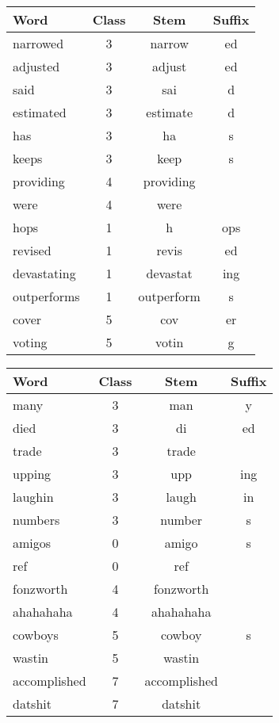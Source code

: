 \documentclass{article}
\begin{document}
\begin{table*}[ht]
\begin{minipage}[b]{0.5\linewidth}\centering
\begin{tabular}{lccc}
\hline
Word & Class & Stem & Suffix \\
\hline
narrowed&3&narrow&ed \\
adjusted&3&adjust&ed \\
said&3&sai&d \\
estimated&3&estimate&d \\
has&3&ha&s \\
keeps&3&keep&s \\
providing & 4 & providing & \\
were&4&were& \\
hops&1&h&ops \\ 
revised&1&revis&ed \\
devastating&1&devastat&ing\\
outperforms&1&outperform&s\\
cover&5&cov&er \\
voting&5&votin&g \\
\hline
 \end{tabular}
\caption{\label{outputWSJ} Sample output from WSJ}
\end{minipage}
\begin{minipage}[b]{0.5\linewidth}\centering
\begin{tabular}{lccc}
\hline
  Word & Class & Stem & Suffix \\
\hline
many & 3 & man & y \\
died & 3 & di & ed \\
trade & 3 & trade &  \\
upping & 3 & upp & ing \\
laughin & 3 & laugh & in \\
numbers & 3 & number & s \\
amigos & 0 & amigo & s \\ 
ref & 0 & ref & \\
fonzworth & 4 & fonzworth & \\
ahahahaha & 4 & ahahahaha & \\
cowboys & 5 & cowboy & s \\
wastin & 5 & wastin & \\
accomplished & 7 & accomplished & \\
datshit & 7 & datshit & \\
\hline
 \end{tabular}
\caption{\label{outputDB} Sample output from DB}
\end{minipage}
\end{table*}
\end{document}
